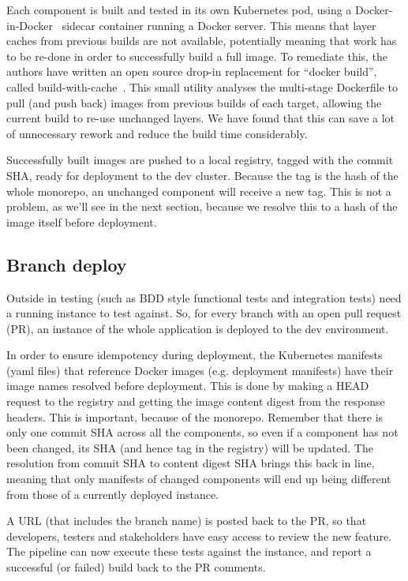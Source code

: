 \documentclass[reprint,amsmath,amssymb,aps]{revtex4-1}
\begin{document}
Each component is built and tested in its own Kubernetes pod, using a Docker-in-Docker~\cite{libraryd61:online} sidecar container running a Docker server. This means that layer caches from previous builds are not available, potentially meaning that work has to be re-done in order to successfully build a full image. To remediate this, the authors have written an open source drop-in replacement for “docker build”, called build-with-cache~\cite{redbadge83:online}. This small utility analyses the multi-stage Dockerfile to pull (and push back) images from previous builds of each target, allowing the current build to re-use unchanged layers. We have found that this can save a lot of unnecessary rework and reduce the build time considerably.

Successfully built images are pushed to a local registry, tagged with the commit SHA, ready for deployment to the dev cluster. Because the tag is the hash of the whole monorepo, an unchanged component will receive a new tag. This is not a problem, as we’ll see in the next section, because we resolve this to a hash of the image itself before deployment.

\subsection{\label{sec:branchdeploy}Branch deploy}

Outside in testing (such as BDD style functional tests and integration tests) need a running instance to test against. So, for every branch with an open pull request (PR), an instance of the whole application is deployed to the dev environment. 

In order to ensure idempotency during deployment, the Kubernetes manifests (yaml files) that reference Docker images (e.g. deployment manifests) have their image names resolved before deployment. This is done by making a HEAD request to the registry and getting the image content digest from the response headers. This is important, because of the monorepo. Remember that there is only one commit SHA across all the components, so even if a component has not been changed, its SHA (and hence tag in the registry) will be updated. The resolution from commit SHA to content digest SHA brings this back in line, meaning that only manifests of changed components will end up being different from those of a currently deployed instance.

A URL (that includes the branch name) is posted back to the PR, so that developers, testers and stakeholders have easy access to review the new feature. The pipeline can now execute these tests against the instance, and report a successful (or failed) build back to the PR comments.
\end{document}
